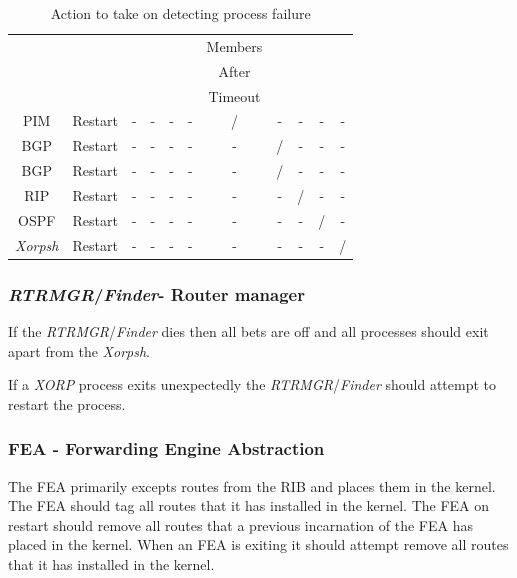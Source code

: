 \documentclass[11pt]{article}
\makeatletter
\newcommand{\xorp} {{\em XORP}\@\xspace}
\newcommand{\finder} {{\em Finder}\@\xspace}
\newcommand{\xorpsh} {{\em Xorpsh}\@\xspace}
\newcommand{\rtrmgr} {{\em RTRMGR}\@\xspace}
\makeatother
\begin{document}
\begin{table}[ht]
\begin{center}
\begin{tabular}{|c|c|c|c|c|c|c|c|c|c|c|}
                &                 &          &      &      &      & Members &      &      &      &         \\
                &                 &          &      &      &      & After   &      &      &      &         \\
                &                 &          &      &      &      & Timeout &      &      &      &         \\\hline
PIM             &  Restart        & -        & -    & -    & -    & /       & -    & -    & -    & -       \\\hline
BGP             &  Restart        & -        & -    & -    & -    & -       & /    & -    & -    & -       \\\hline
BGP             &  Restart        & -        & -    & -    & -    & -       & /    & -    & -    & -       \\\hline
RIP             &  Restart        & -        & -    & -    & -    & -       & -    & /    & -    & -       \\\hline
OSPF            &  Restart        & -        & -    & -    & -    & -       & -    & -    & /    & -       \\\hline
\xorpsh         &  Restart        & -        & -    & -    & -    & -       & -    & -    & -    & /       \\\hline
\end{tabular}
\end{center}
\caption{\label{failure_table}Action to take on detecting process failure}
\end{table}

\subsubsection{\rtrmgr/\finder - Router manager}

If the \rtrmgr/\finder dies then all bets are off and all processes
should exit apart from the \xorpsh.

If a \xorp process exits unexpectedly the \rtrmgr/\finder should
attempt to restart the process.

\subsubsection{FEA - Forwarding Engine Abstraction}

The FEA primarily excepts routes from the RIB and places them in the
kernel. The FEA should tag all routes that it has installed in the
kernel. The FEA on restart should remove all routes that a previous
incarnation of the FEA has placed in the kernel. When an FEA is
exiting it should attempt remove all routes that it has installed in
the kernel.
\end{document}
